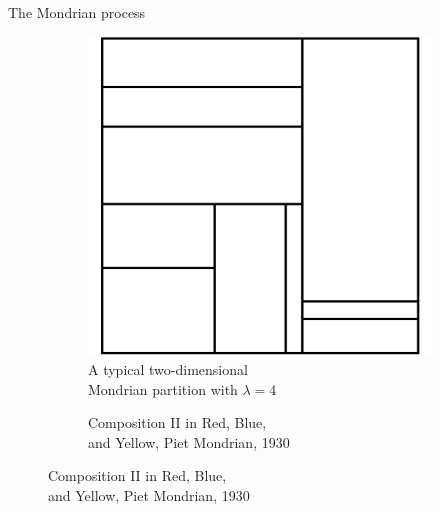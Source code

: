 \documentclass{beamer}
\begin{document}
\begin{frame}{The Mondrian process}
  \begin{figure}[ht]
    \centering
    \begin{subfigure}{0.4\textwidth}
      \centering
      \includegraphics[scale=0.7]{graphics/piet_mondrian.png}%
      \caption*{A typical two-dimensional \\
      Mondrian partition with $\lambda = 4$}
    \end{subfigure}
    \hspace*{10mm}
    \begin{subfigure}{0.4\textwidth}
      \centering
      \setlength{\fboxsep}{0pt}%
      \setlength{\fboxrule}{0.28mm}%
      \caption*{Composition II in Red, Blue, \\ and Yellow, Piet Mondrian, 1930}
    \end{subfigure}
  \end{figure}


\end{frame}
\end{document}
